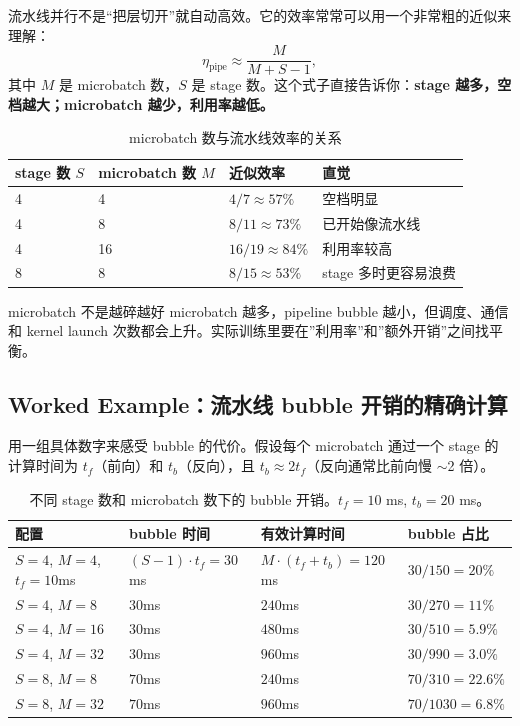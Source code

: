 流水线并行不是“把层切开”就自动高效。它的效率常常可以用一个非常粗的近似来理解：
\[
\eta_{\text{pipe}} \approx \frac{M}{M + S - 1},
\]
其中 $M$ 是 microbatch 数，$S$ 是 stage 数。这个式子直接告诉你：\textbf{stage 越多，空档越大；microbatch 越少，利用率越低。}

\begin{table}[H]
\centering
\small
\begin{tabular}{p{2.3cm}p{2.5cm}p{3.6cm}p{4cm}}
\toprule
\textbf{stage 数 $S$} & \textbf{microbatch 数 $M$} & \textbf{近似效率} & \textbf{直觉} \\
\midrule
4 & 4 & $4/7 \approx 57\%$ & 空档明显 \\
4 & 8 & $8/11 \approx 73\%$ & 已开始像流水线 \\
4 & 16 & $16/19 \approx 84\%$ & 利用率较高 \\
8 & 8 & $8/15 \approx 53\%$ & stage 多时更容易浪费 \\
\bottomrule
\end{tabular}
\caption{microbatch 数与流水线效率的关系}
\end{table}

\begin{warningbox}{microbatch 不是越碎越好}
microbatch 越多，pipeline bubble 越小，但调度、通信和 kernel launch 次数都会上升。实际训练里要在”利用率”和”额外开销”之间找平衡。
\end{warningbox}

\subsection{Worked Example：流水线 bubble 开销的精确计算}

用一组具体数字来感受 bubble 的代价。假设每个 microbatch 通过一个 stage 的计算时间为 $t_f$（前向）和 $t_b$（反向），且 $t_b \approx 2 t_f$（反向通常比前向慢 $\sim$2 倍）。

\begin{table}[H]
\centering
\small
\begin{tabular}{p{3.8cm}p{2.5cm}p{2.5cm}p{3.5cm}}
\toprule
\textbf{配置} & \textbf{bubble 时间} & \textbf{有效计算时间} & \textbf{bubble 占比} \\
\midrule
$S=4$, $M=4$, $t_f=10$ms & $(S-1) \cdot t_f = 30$ms & $M \cdot (t_f + t_b) = 120$ms & $30/150 = 20\%$ \\
$S=4$, $M=8$ & $30$ms & $240$ms & $30/270 = 11\%$ \\
$S=4$, $M=16$ & $30$ms & $480$ms & $30/510 = 5.9\%$ \\
$S=4$, $M=32$ & $30$ms & $960$ms & $30/990 = 3.0\%$ \\
$S=8$, $M=8$ & $70$ms & $240$ms & $70/310 = 22.6\%$ \\
$S=8$, $M=32$ & $70$ms & $960$ms & $70/1030 = 6.8\%$ \\
\bottomrule
\end{tabular}
\caption{不同 stage 数和 microbatch 数下的 bubble 开销。$t_f = 10$ ms, $t_b = 20$ ms。}
\end{table}

